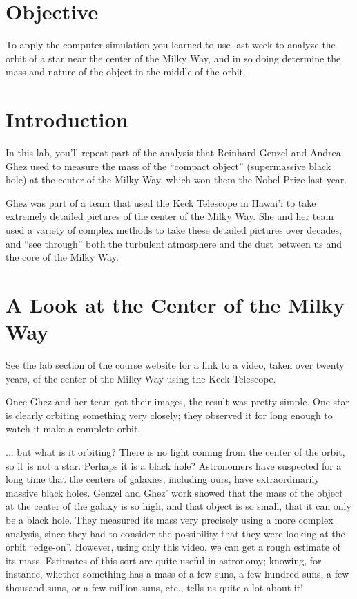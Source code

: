 \documentclass[11pt]{article}
\begin{document}
\section{Objective}

To apply the computer simulation you learned to use last week to analyze the orbit of a star near the center of the Milky Way, and in so doing determine the mass and nature of the object in the middle of the orbit.



\section{Introduction}
In this lab, you’ll repeat part of the analysis that Reinhard Genzel and Andrea Ghez used to measure the mass of the “compact object” (supermassive black hole) at the center of the Milky Way, which won them the Nobel Prize last year.

Ghez was part of a team that used the Keck Telescope in Hawai’i to take extremely detailed pictures of the center of the Milky Way. She and her team used a variety of complex methods to take these detailed pictures over decades, and “see through” both the turbulent atmosphere and the dust between us and the core of the Milky Way.



\section{A Look at the Center of the Milky Way}

See the lab section of the course website for a link to a video, taken over twenty years, of the center of the Milky Way using the Keck Telescope.

Once Ghez and her team got their images, the result was pretty simple. One star is clearly orbiting something very closely; they observed it for long enough to watch it make a complete orbit. 

... but what is it orbiting? There is no light coming from the center of the orbit, so it is not a star. Perhaps it is a black hole? Astronomers have suspected for a long time that the centers of galaxies, including ours, have extraordinarily massive black holes. Genzel and Ghez’ work showed that the mass of the object at the center of the galaxy is so high, and that object is so small, that it can only be a black hole. They measured its mass very precisely using a more complex analysis, since they had to consider the possibility that they were looking at the orbit ``edge-on''. However, using only this video, we can get a rough estimate of its mass. Estimates of this sort are quite useful in astronomy; knowing, for instance, whether something has a mass of a few suns, a few hundred suns, a few thousand suns, or a few million suns, etc., tells us quite a lot about it!
\vspace{0.5in}
\end{document}
